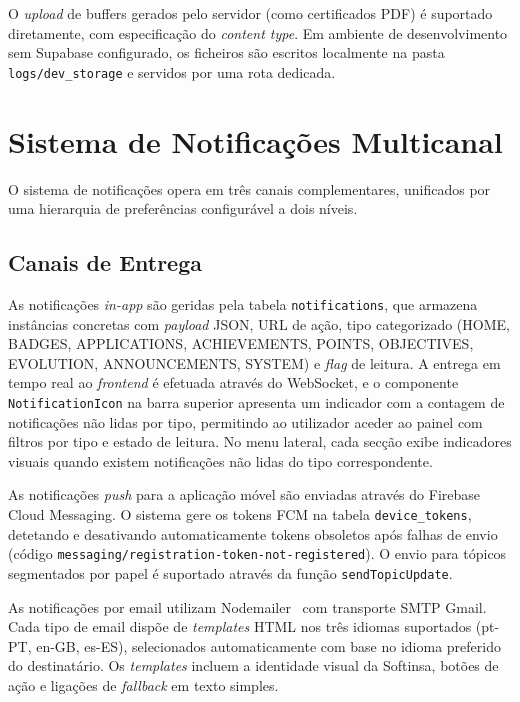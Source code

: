 \documentclass[12pt,a4paper]{report}
\begin{document}
O \textit{upload} de buffers gerados pelo servidor (como certificados PDF) é suportado diretamente, com especificação do \textit{content type}. Em ambiente de desenvolvimento sem Supabase configurado, os ficheiros são escritos localmente na pasta \texttt{logs/dev\_storage} e servidos por uma rota dedicada.

\section{Sistema de Notificações Multicanal}

O sistema de notificações opera em três canais complementares, unificados por uma hierarquia de preferências configurável a dois níveis.

\subsection{Canais de Entrega}

As notificações \textit{in-app} são geridas pela tabela \texttt{notifications}, que armazena instâncias concretas com \textit{payload} JSON, URL de ação, tipo categorizado (HOME, BADGES, APPLICATIONS, ACHIEVEMENTS, POINTS, OBJECTIVES, EVOLUTION, ANNOUNCEMENTS, SYSTEM) e \textit{flag} de leitura. A entrega em tempo real ao \textit{frontend} é efetuada através do WebSocket, e o componente \texttt{NotificationIcon} na barra superior apresenta um indicador com a contagem de notificações não lidas por tipo, permitindo ao utilizador aceder ao painel com filtros por tipo e estado de leitura. No menu lateral, cada secção exibe indicadores visuais quando existem notificações não lidas do tipo correspondente.

As notificações \textit{push} para a aplicação móvel são enviadas através do Firebase Cloud Messaging. O sistema gere os tokens FCM na tabela \texttt{device\_tokens}, detetando e desativando automaticamente tokens obsoletos após falhas de envio (código \texttt{messaging/\allowbreak registration\hbox{-}\allowbreak token\hbox{-}\allowbreak not\hbox{-}\allowbreak registered}). O envio para tópicos segmentados por papel é suportado através da função \texttt{sendTopicUpdate}.

As notificações por email utilizam Nodemailer~\cite{nodemailer} com transporte SMTP Gmail. Cada tipo de email dispõe de \textit{templates} HTML nos três idiomas suportados (pt-PT, en-GB, es-ES), selecionados automaticamente com base no idioma preferido do destinatário. Os \textit{templates} incluem a identidade visual da Softinsa, botões de ação e ligações de \textit{fallback} em texto simples.
\end{document}
